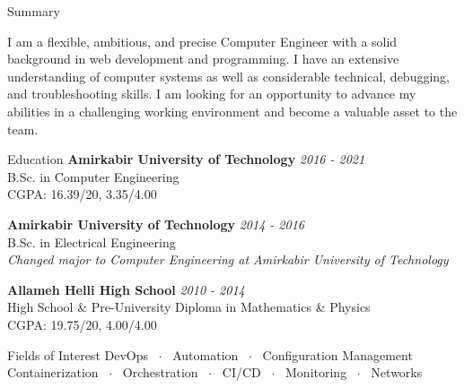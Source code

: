 \documentclass{resume} %
\begin{document}
\begin{rSection}{Summary}

  I am a flexible, ambitious, and precise Computer Engineer with a solid background in web development and programming.
  I have an extensive understanding of computer systems as well as considerable technical, debugging, and troubleshooting skills.
  I am looking for an opportunity to advance my abilities in a challenging working environment and become a valuable asset to the team.
\end{rSection}

\begin{rSection}{Education}
  {\bf Amirkabir University of Technology} \hfill {\em 2016 - 2021} \\
  B.Sc. in Computer Engineering \\
  CGPA: 16.39/20, 3.35/4.00

  {\bf Amirkabir University of Technology} \hfill {\em 2014 - 2016} \\
  B.Sc. in Electrical Engineering \\
  {\em Changed major to Computer Engineering at Amirkabir University of Technology}

  {\bf Allameh Helli High School} \hfill {\em 2010 - 2014} \\
  High School \& Pre-University Diploma in Mathematics \& Physics \\
  CGPA: 19.75/20, 4.00/4.00
\end{rSection}

\begin{rSection}{Fields of Interest}
  DevOps ~$\cdot$~ Automation ~$\cdot$~ Configuration Management \\[1ex]
  Containerization ~$\cdot$~ Orchestration ~$\cdot$~ CI/CD ~$\cdot$~ Monitoring ~$\cdot$~ Networks
\end{rSection}
\end{document}
